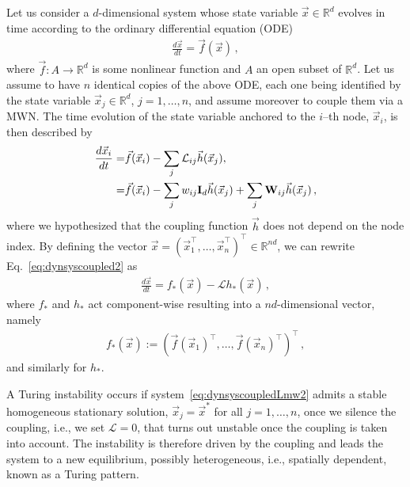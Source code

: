 \documentclass[aps,showpacs,preprintnumbers,amsmath,amssymb,twocolumn,superscriptaddress,floatfix,nofootinbib,10pt,pre]{revtex4-1}
\begin{document}
Let us consider a $d$-dimensional system whose state variable $\vec{x}\in\mathbb{R}^d$ evolves in time according to the ordinary differential equation (ODE)
\begin{align}
    \label{eq:isolated}
    \frac{d\vec{x}}{dt}=\vec{f}(\vec{x})\,,
\end{align}
where $\vec{f}:A\rightarrow\mathbb{R}^d$ is some nonlinear function and $A$ an open subset of $\mathbb{R}^d$. Let us assume to have $n$ identical copies of the above ODE, each one being identified by the state variable $\vec{x}_j\in\mathbb{R}^d$, $j=1,\dots,n$, and assume moreover to couple them via a MWN. The time evolution of the state variable anchored to the $i$--th node, $\vec{x}_i$, is then described by
\begin{align}
\label{eq:dynsyscoupled2}
\frac{d\vec{x}_i}{dt}=& \vec{f}(\vec{x}_i)- \sum_j \mathcal{L}_{ij}\vec{h}(\vec{x}_j),\notag\\
=&\vec{f}(\vec{x}_i) -\sum_j {w}_{ij}\mathbf{I}_d \vec{h}(\vec{x}_j) + \sum_j \mathbf{W}_{ij}\vec{h}(\vec{x}_j)\, ,
\end{align}
where we hypothesized that the coupling function $\vec{h}$ does not depend on the node index. By defining the vector $\vec{x}=(\vec{x}_1^\top,\dots,\vec{x}_n^\top)^\top\in \mathbb{R}^{nd}$, we can rewrite Eq.~\eqref{eq:dynsyscoupled2} as
\begin{align}
\label{eq:dynsyscoupledLmw2}
\frac{d\vec{x}}{dt}={f}_*(\vec{x})- \mathcal{L}h_*(\vec{x})\, ,
\end{align}
where $f_*$ and $h_*$ act component-wise resulting into a $nd$-dimensional vector, namely
\begin{align}
 {f}_*(\vec{x}):=(\vec{f}(\vec{x}_1)^\top,\dots,\vec{f}(\vec{x}_n)^\top)^\top\, ,
\end{align}
and similarly for $h_*$.

A Turing instability occurs if  system~\eqref{eq:dynsyscoupledLmw2} admits a stable homogeneous stationary solution, $\vec{x}_j=\vec{x}^*$ for all $j=1,\dots,n$, once we silence the coupling, i.e., we set $\mathcal{L}=0$, that turns out unstable once the coupling is taken into account. The instability is therefore driven by the coupling and leads the system to a new equilibrium, possibly heterogeneous, i.e., spatially dependent, known as a Turing pattern.
\end{document}
